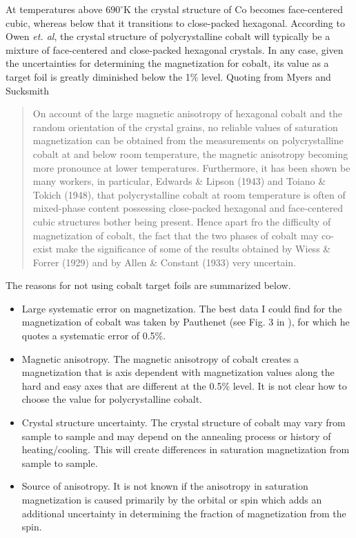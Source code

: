 \documentclass[12pt]{article}
\begin{document}
At temperatures above $690^{\circ}$K the crystal structure of Co becomes face-centered cubic, whereas below that it transitions to close-packed hexagonal. According to Owen {\it et. al}, the crystal structure of polycrystalline cobalt will typically be a mixture of face-centered and close-packed hexagonal crystals\cite{Owen1954}. In any case, given the uncertainties for determining the magnetization for cobalt, its value as a target foil is greatly diminished below the 1\% level.  Quoting from Myers and Sucksmith \cite{Myers1951}
\begin{quote}
On account of the large magnetic anisotropy of hexagonal cobalt and the random orientation of the crystal grains, no reliable values of saturation magnetization can be obtained from the measurements on polycrystalline cobalt at and below room temperature, the magnetic anisotropy becoming more pronounce at lower temperatures. Furthermore, it has been shown be many workers, in particular, Edwards \& Lipson (1943) and Toiano \& Tokich (1948), that polycrystalline cobalt at room temperature is often of mixed-phase content possessing close-packed hexagonal and face-centered cubic structures bother being present. Hence apart fro the difficulty of magnetization of cobalt, the fact that the two phases of cobalt may co-exist make the significance of some of the results obtained by Wiess \& Forrer (1929) and by Allen \& Constant (1933) very uncertain.
\end{quote}
The reasons for not using cobalt target foils are summarized below.
\begin{itemize}
\item{Large systematic error on magnetization. The best data I could find for the magnetization of cobalt was taken by Pauthenet (see Fig. 3 in \cite{PauthenetMar1982}), for which he quotes a systematic error of 0.5\%.}
\item{Magnetic anisotropy. The magnetic anisotropy of cobalt creates a magnetization that is axis dependent with magnetization values along the hard and easy axes that are different at the  0.5\% level. It is not clear how to choose the value for polycrystalline cobalt.}
\item{Crystal structure uncertainty. The crystal structure of cobalt may vary from sample to sample and may depend on the annealing process or history of heating/cooling. This will create differences in saturation magnetization from sample to sample.}
\item{Source of anisotropy. It is not known if the anisotropy in saturation magnetization is caused primarily by the orbital or spin which adds an additional uncertainty in determining the fraction of magnetization from the spin.}  
\end{itemize}
\end{document}
